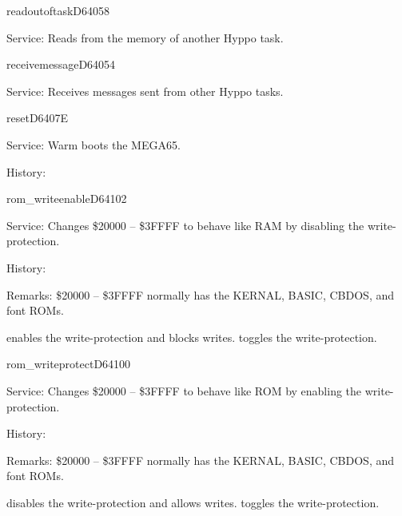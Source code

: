 \begin{hyppotrap}{readoutoftask}{D640}{58}
\item [Service:]
  Reads from the memory of another Hyppo task.
\notimplemented
\end{hyppotrap}


\begin{hyppotrap}{receivemessage}{D640}{54}
\item [Service:]
  Receives messages sent from other Hyppo tasks.
\notimplemented
\end{hyppotrap}


\newpage
\begin{hyppotrap}{reset}{D640}{7E}
\item [Service:]
  Warm boots the MEGA65.
\item [History:]
\end{hyppotrap}


\newpage
\begin{hyppotrap}{rom\_writeenable}{D641}{02}
\item [Service:]
  Changes \$20000 -- \$3FFFF to behave like RAM by disabling the
  write-protection.
\item [History:]
\item [Remarks:]
  \$20000 -- \$3FFFF normally has the KERNAL, BASIC, CBDOS, and font ROMs.

   enables the write-protection and blocks writes.
   toggles the write-protection.
\end{hyppotrap}


\newpage
\begin{hyppotrap}{rom\_writeprotect}{D641}{00}
\item [Service:]
  Changes \$20000 -- \$3FFFF to behave like ROM by enabling the
  write-protection.
\item [History:]
\item [Remarks:]
  \$20000 -- \$3FFFF normally has the KERNAL, BASIC, CBDOS, and font ROMs.

   disables the write-protection and allows writes.
   toggles the write-protection.
\end{hyppotrap}


